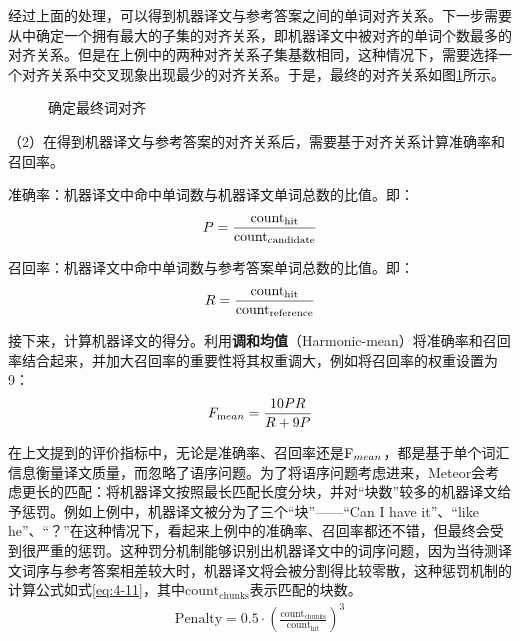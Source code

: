 \parinterval 经过上面的处理，可以得到机器译文与参考答案之间的单词对齐关系。下一步需要从中确定一个拥有最大的子集的对齐关系，即机器译文中被对齐的单词个数最多的对齐关系。但是在上例中的两种对齐关系子集基数相同，这种情况下，需要选择一个对齐关系中交叉现象出现最少的对齐关系。于是，最终的对齐关系如图\ref{fig:4-6}所示。

\begin{figure}[htp]
    \centering
	
   	\caption{确定最终词对齐}
  	 \label{fig:4-6}
\end{figure}

\parinterval （2）在得到机器译文与参考答案的对齐关系后，需要基于对齐关系计算准确率和召回率。

\parinterval 准确率：机器译文中命中单词数与机器译文单词总数的比值。即：
\begin{eqnarray}
{P} = \frac {\textrm{count}_{\textrm{hit}}}{\textrm{count}_{\textrm{candidate}}}
\label{eq:4-8}
\end{eqnarray}

\parinterval 召回率：机器译文中命中单词数与参考答案单词总数的比值。即：
\begin{eqnarray}
{R} = \frac {\textrm{count}_{\textrm{hit}}}{\textrm{count}_{\textrm{reference}}}
\label{eq:4-9}
\end{eqnarray}

\parinterval 接下来，计算机器译文的得分。利用{\small\sffamily\bfseries{调和均值}}（Harmonic-mean）将准确率和召回率结合起来，并加大召回率的重要性将其权重调大，例如将召回率的权重设置为9：
\begin{eqnarray}
{F_{\textrm mean}} = \frac {10{PR}}{{R+9P}}
\label{eq:4-10}
\end{eqnarray}

\parinterval 在上文提到的评价指标中，无论是准确率、召回率还是$\textrm F_{mean}$，都是基于单个词汇信息衡量译文质量，而忽略了语序问题。为了将语序问题考虑进来，Meteor会考虑更长的匹配：将机器译文按照最长匹配长度分块，并对“块数”较多的机器译文给予惩罚。例如上例中，机器译文被分为了三个“块”——“Can I have it”、“like he”、“？”在这种情况下，看起来上例中的准确率、召回率都还不错，但最终会受到很严重的惩罚。这种罚分机制能够识别出机器译文中的词序问题，因为当待测译文词序与参考答案相差较大时，机器译文将会被分割得比较零散，这种惩罚机制的计算公式如式\eqref{eq:4-11}，其中$\textrm {count}_{\textrm{chunks}}$表示匹配的块数。
\begin{eqnarray}
\textrm {Penalty} = 0.5 \cdot {\left({\frac{{\textrm {count}}_{\textrm {chunks}}}{\textrm {count}_{\textrm{hit}}}} \right)^3}
\label{eq:4-11}
\end{eqnarray}

